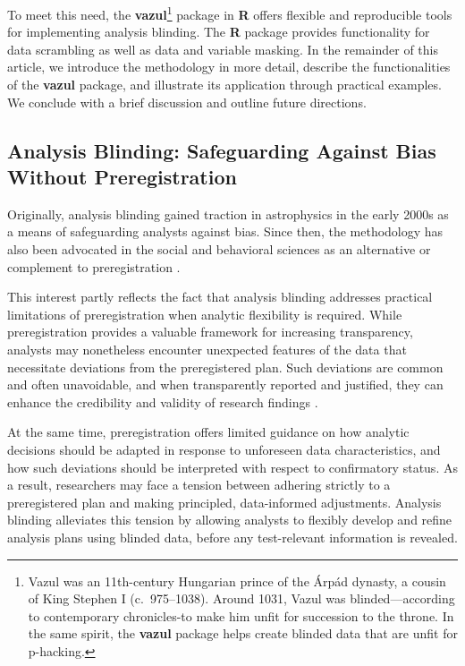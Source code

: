 To meet this need, the \textbf{vazul}\footnote{Vazul was an 11th-century Hungarian prince of the Árpád dynasty, a cousin of King Stephen I (c.~975--1038). Around 1031, Vazul was blinded---according to contemporary chronicles-to make him unfit for succession to the throne. In the same spirit, the \textbf{vazul} package helps create blinded data that are unfit for p-hacking.} package \citep{Nagy2026-gb} in \textbf{R} \citep{R2025} offers flexible and reproducible tools for implementing analysis blinding. The \textbf{R} package provides functionality for data scrambling as well as data and variable masking. In the remainder of this article, we introduce the methodology in more detail, describe the functionalities of the \textbf{vazul} package, and illustrate its application through practical examples. We conclude with a brief discussion and outline future directions.

\subsection{Analysis Blinding: Safeguarding Against Bias Without Preregistration}\label{analysis-blinding-safeguarding-against-bias-without-preregistration}

Originally, analysis blinding gained traction in astrophysics in the early 2000s \citep{maccoun2018psychological} as a means of safeguarding analysts against bias. Since then, the methodology has also been advocated in the social and behavioral sciences as an alternative or complement to preregistration \citep{dutilh2021blinding, nagy2025bestiary, maccoun2021removebiases, maccoun2015hide, maccoun2018psychological, aczel2020transparency}.

This interest partly reflects the fact that analysis blinding addresses practical limitations of preregistration when analytic flexibility is required. While preregistration provides a valuable framework for increasing transparency, analysts may nonetheless encounter unexpected features of the data that necessitate deviations from the preregistered plan. Such deviations are common and often unavoidable, and when transparently reported and justified, they can enhance the credibility and validity of research findings \citep[e.g.,][]{vandenakker2024potential, Lakens2024-tj, Schneider2022-oq, Song2022-em}.

At the same time, preregistration offers limited guidance on how analytic decisions should be adapted in response to unforeseen data characteristics, and how such deviations should be interpreted with respect to confirmatory status. As a result, researchers may face a tension between adhering strictly to a preregistered plan and making principled, data-informed adjustments. Analysis blinding alleviates this tension by allowing analysts to flexibly develop and refine analysis plans using blinded data, before any test-relevant information is revealed.

